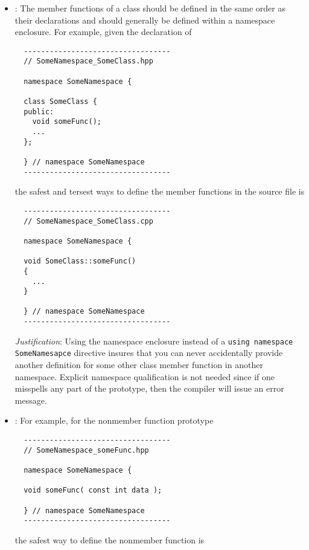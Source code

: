 \begin{itemize}
{}\item\GCGNamespaceClassFuncDefs: The member functions of a class should be
defined in the same order as their declarations and should generally be
defined within a namespace enclosure.  For example, given the declaration of

{\small\begin{verbatim}
  ----------------------------------
  // SomeNamespace_SomeClass.hpp

  namespace SomeNamespace {

  class SomeClass {
  public:
    void someFunc();
    ...
  };

  } // namespace SomeNamespace
  ----------------------------------
\end{verbatim}}

the safest and tersest ways to define the member functions in the
source file is

{\small\begin{verbatim}
  ----------------------------------
  // SomeNamespace_SomeClass.cpp

  namespace SomeNamespace {

  void SomeClass::someFunc()
  {
    ...
  }

  } // namespace SomeNamespace
  ----------------------------------
\end{verbatim}}

{}\textit{Justification}: Using the namespace enclosure instead of a
{}\texttt{using namespace SomeNamesapce} directive insures that you can never
accidentally provide another definition for some other class member function
in another namespace.  Explicit namespace qualification is not needed since if
one misspells any part of the prototype, then the compiler will issue an error
message.


{}\item\GCGNamespaceFuncDefs: For example, for the nonmember function prototype

{\small\begin{verbatim}
  ----------------------------------
  // SomeNamespace_someFunc.hpp

  namespace SomeNamespace {

  void someFunc( const int data );

  } // namespace SomeNamespace
  ----------------------------------
\end{verbatim}}

the safest way to define the nonmember function is


\end{itemize}
